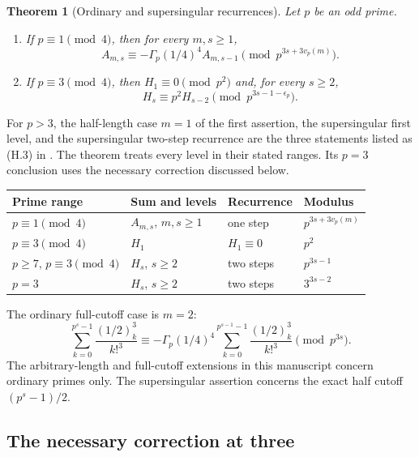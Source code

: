 \documentclass[11pt,a4paper]{article}
\newtheorem{theorem}{Theorem}[section]
\begin{document}
\begin{theorem}[Ordinary and supersingular recurrences]\label{thm:main}
Let $p$ be an odd prime.
\begin{enumerate}
\item If $p\equiv1\pmod4$, then for every $m,s\ge1$,
\begin{equation}\label{eq:ordinarytarget}
 A_{m,s}\equiv-\Gamma_p(1/4)^4A_{m,s-1}
                  \pmod{p^{3s+3v_p(m)}}.
\end{equation}
\item If $p\equiv3\pmod4$, then $H_1\equiv0\pmod{p^2}$ and, for
every $s\ge2$,
\begin{equation}\label{eq:sstarget}
 H_s\equiv p^2H_{s-2}\pmod{p^{3s-1-\epsilon_p}}.
\end{equation}
\end{enumerate}
\end{theorem}

For $p>3$, the half-length case $m=1$ of the first assertion, the
supersingular first level, and the supersingular two-step recurrence
are the three statements listed as (H.3) in \cite[Table~2, (H.3)]{Swisher}.
The theorem treats every level in their stated ranges. Its $p=3$
conclusion uses the necessary correction discussed below.

\begin{center}
\begin{tabular}{@{}llll@{}}\toprule
Prime range & Sum and levels & Recurrence & Modulus\\\midrule
$p\equiv1\pmod4$ & $A_{m,s}$, $m,s\ge1$
 & one step & $p^{3s+3v_p(m)}$\\
$p\equiv3\pmod4$ & $H_1$ & $H_1\equiv0$ & $p^2$\\
$p\ge7$, $p\equiv3\pmod4$ & $H_s$, $s\ge2$
 & two steps & $p^{3s-1}$\\
$p=3$ & $H_s$, $s\ge2$ & two steps & $3^{3s-2}$\\\bottomrule
\end{tabular}
\end{center}

The ordinary full-cutoff case is $m=2$:
\[
 \sum_{k=0}^{p^s-1}\frac{(1/2)_k^3}{k!^3}
 \equiv-\Gamma_p(1/4)^4
 \sum_{k=0}^{p^{s-1}-1}\frac{(1/2)_k^3}{k!^3}
 \pmod{p^{3s}}.
\]
The arbitrary-length and full-cutoff extensions in this manuscript
concern ordinary primes only. The supersingular assertion concerns
the exact half cutoff $(p^s-1)/2$.

\subsection{The necessary correction at three}
\end{document}
